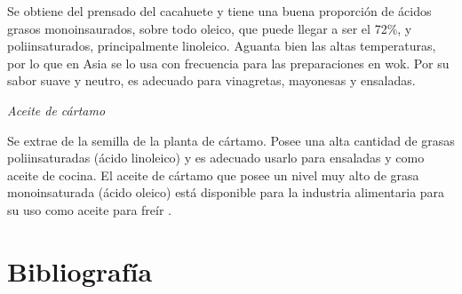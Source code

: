 \documentclass[a4paper,12pt]{article}
\begin{document}
\begin{multicols}{2}
Se obtiene del prensado del cacahuete y tiene una buena proporción de ácidos grasos monoinsaurados, sobre todo oleico, que puede llegar a ser el 72\%, y poliinsaturados, principalmente linoleico. Aguanta bien las altas temperaturas, por lo que en Asia se lo usa con frecuencia para las preparaciones en wok. Por su sabor suave y neutro, es adecuado para vinagretas, mayonesas y ensaladas.

\textit{Aceite de cártamo}

Se extrae de la semilla de la planta de cártamo. Posee una alta cantidad de grasas poliinsaturadas (ácido linoleico) y es adecuado usarlo para ensaladas y como aceite de cocina. El aceite de cártamo que posee un nivel muy alto de grasa monoinsaturada (ácido oleico) está disponible para la industria alimentaria para su uso como aceite para freír \cite{Hamdan2009a,Hamdan2009}.



\section{Bibliografía}





\end{multicols}
\end{document}
